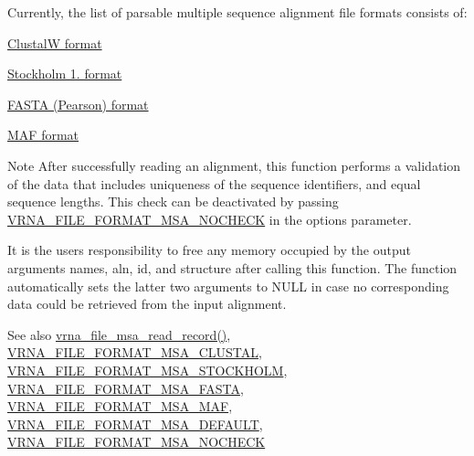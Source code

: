 Currently, the list of parsable multiple sequence alignment file formats consists of\+:
\begin{DoxyItemize}
\item \hyperlink{file_formats_msa-formats-clustal}{ClustalW format}
\item \hyperlink{file_formats_msa-formats-stockholm}{Stockholm 1. format}
\item \hyperlink{file_formats_msa-formats-fasta}{F\+A\+S\+TA (Pearson) format}
\item \hyperlink{file_formats_msa-formats-maf}{M\+AF format}
\end{DoxyItemize}\begin{DoxyNote}{Note}
After successfully reading an alignment, this function performs a validation of the data that includes uniqueness of the sequence identifiers, and equal sequence lengths. This check can be deactivated by passing \hyperlink{group__file__utils_ga229fb3778ecabea4782902b69fa48fd1}{V\+R\+N\+A\+\_\+\+F\+I\+L\+E\+\_\+\+F\+O\+R\+M\+A\+T\+\_\+\+M\+S\+A\+\_\+\+N\+O\+C\+H\+E\+CK} in the {\ttfamily options} parameter.

It is the users responsibility to free any memory occupied by the output arguments {\ttfamily names}, {\ttfamily aln}, {\ttfamily id}, and {\ttfamily structure} after calling this function. The function automatically sets the latter two arguments to {\ttfamily N\+U\+LL} in case no corresponding data could be retrieved from the input alignment.
\end{DoxyNote}
\begin{DoxySeeAlso}{See also}
\hyperlink{group__file__utils_ga59204cd1daa4927f5127cc65a2886efd}{vrna\+\_\+file\+\_\+msa\+\_\+read\+\_\+record()}, \hyperlink{group__file__utils_ga79a23de2c7249f2cccd762e475c81859}{V\+R\+N\+A\+\_\+\+F\+I\+L\+E\+\_\+\+F\+O\+R\+M\+A\+T\+\_\+\+M\+S\+A\+\_\+\+C\+L\+U\+S\+T\+AL}, \hyperlink{group__file__utils_ga62be992445cd8ab2ad7a8fded944338b}{V\+R\+N\+A\+\_\+\+F\+I\+L\+E\+\_\+\+F\+O\+R\+M\+A\+T\+\_\+\+M\+S\+A\+\_\+\+S\+T\+O\+C\+K\+H\+O\+LM}, \hyperlink{group__file__utils_gacf6274a2c825f34e4131404665b00604}{V\+R\+N\+A\+\_\+\+F\+I\+L\+E\+\_\+\+F\+O\+R\+M\+A\+T\+\_\+\+M\+S\+A\+\_\+\+F\+A\+S\+TA}, \hyperlink{group__file__utils_gab3186d774c01570d2a47d0308eec4927}{V\+R\+N\+A\+\_\+\+F\+I\+L\+E\+\_\+\+F\+O\+R\+M\+A\+T\+\_\+\+M\+S\+A\+\_\+\+M\+AF}, \hyperlink{group__file__utils_ga4acc255373831856a8417b68de8a94c0}{V\+R\+N\+A\+\_\+\+F\+I\+L\+E\+\_\+\+F\+O\+R\+M\+A\+T\+\_\+\+M\+S\+A\+\_\+\+D\+E\+F\+A\+U\+LT}, \hyperlink{group__file__utils_ga229fb3778ecabea4782902b69fa48fd1}{V\+R\+N\+A\+\_\+\+F\+I\+L\+E\+\_\+\+F\+O\+R\+M\+A\+T\+\_\+\+M\+S\+A\+\_\+\+N\+O\+C\+H\+E\+CK}
\end{DoxySeeAlso}


